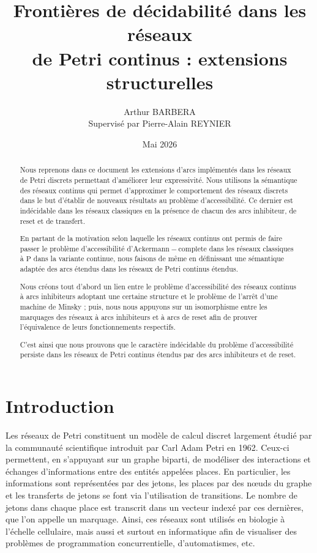 \documentclass{article}
\title{Frontières de décidabilité dans les réseaux\\de Petri continus : extensions structurelles}
\author{Arthur BARBERA\\Supervisé par Pierre-Alain REYNIER}
\date{Mai 2026}
\theoremstyle{remark}
\theoremstyle{remark}
\begin{document}
\maketitle

\begin{abstract}
    Nous reprenons dans ce document les extensions d'arcs implémentés dans les réseaux de Petri discrets permettant d'améliorer leur expressivité. Nous utilisons la sémantique des réseaux continus qui permet d'approximer le comportement des réseaux discrets dans le but d'établir de nouveaux résultats au problème d'accessibilité. Ce dernier est indécidable dans les réseaux classiques en la présence de chacun des arcs inhibiteur, de reset et de transfert.
    
    En partant de la motivation selon laquelle les réseaux continus ont permis de faire passer le problème d'accessibilité d'$\mathrm{Ackermann-complete}$ dans les réseaux classiques à $\mathrm{P}$ dans la variante continue, nous faisons de même en définissant une sémantique adaptée des arcs étendus dans les réseaux de Petri continus étendus.

    Nous créons tout d'abord un lien entre le problème d'accessibilité des réseaux continus à arcs inhibiteurs adoptant une certaine structure et le problème de l'arrêt d'une machine de Minsky ; puis, nous nous appuyons sur un isomorphisme entre les marquages des réseaux à arcs inhibiteurs et à arcs de reset afin de prouver l'équivalence de leurs fonctionnements respectifs.

    C'est ainsi que nous prouvons que le caractère indécidable du problème d'accessibilité persiste dans les réseaux de Petri continus étendus par des arcs inhibiteurs et de reset.
\end{abstract}

\newpage

\tableofcontents

\newpage

\section{Introduction}

Les réseaux de Petri constituent un modèle de calcul discret largement étudié par la communauté scientifique introduit par Carl Adam Petri en 1962. Ceux-ci permettent, en s'appuyant sur un graphe biparti, de modéliser des interactions et échanges d'informations entre des entités appelées places. En particulier, les informations sont représentées par des jetons, les places par des nœuds du graphe et les transferts de jetons se font via l'utilisation de transitions. Le nombre de jetons dans chaque place est transcrit dans un vecteur indexé par ces dernières, que l'on appelle un marquage. Ainsi, ces réseaux sont utilisés en biologie à l'échelle cellulaire, mais aussi et surtout en informatique afin de visualiser des problèmes de programmation concurrentielle, d'automatismes, etc.
\end{document}
